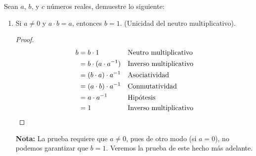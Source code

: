 \documentclass[11pt]{article}
\begin{document}
Sean $a$, $b$, y $c$ números reales, demuestre lo siguiente:
 \begin{enumerate}[label=\alph*)]
 \item Si $a\neq 0$ y $a\cdot b = a$, entonces $b=1$. (Unicidad del neutro multiplicativo).
 \begin{proof} 
 \begin{align*}
  b &= b \cdot 1 && \text{Neutro multiplicativo}\\
  &= b \cdot (a\cdot a^{-1}) && \text{Inverso multiplicativo}\\
  &= (b\cdot a) \cdot a^{-1} && \text{Asociatividad}\\
  &= (a\cdot b) \cdot a^{-1} && \text{Conmutatividad}\\
  &= a \cdot a^{-1} && \text{Hipótesis}\\
  &= 1 && \text{Inverso multiplicativo} \qedhere
 \end{align*} 
 \end{proof}
 \textbf{Nota:} La prueba requiere que $a\neq 0$, pues de otro modo (si $a=0$), no podemos garantizar que $b=1$. Veremos la prueba de este hecho más adelante.
 

\end{enumerate}
\end{document}
